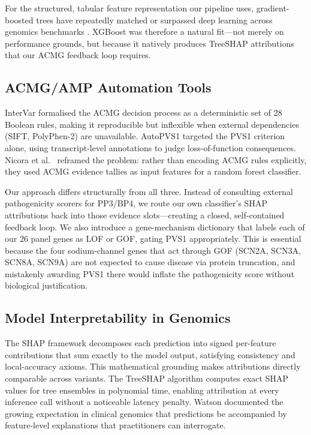 \documentclass[12pt,a4paper]{article}
\begin{document}
For the structured, tabular feature representation our pipeline
uses, gradient-boosted trees have repeatedly matched or surpassed
deep learning across genomics benchmarks \cite{parente2021}.
XGBoost \cite{chen2016xgboost} was therefore a natural fit---not
merely on performance grounds, but because it natively produces
TreeSHAP attributions that our ACMG feedback loop requires.

\subsection{ACMG/AMP Automation Tools}

InterVar \cite{intervar2017} formalised the ACMG decision process
as a deterministic set of 28 Boolean rules, making it reproducible
but inflexible when external dependencies (SIFT, PolyPhen-2) are
unavailable. AutoPVS1 \cite{autopvs1_2020} targeted the PVS1
criterion alone, using transcript-level annotations to judge
loss-of-function consequences. Nicora et al.\ \cite{nicora2022}
reframed the problem: rather than encoding ACMG rules explicitly,
they used ACMG evidence tallies as input features for a random
forest classifier.

Our approach differs structurally from all three. Instead of
consulting external pathogenicity scorers for PP3/BP4, we route
our own classifier's SHAP attributions back into those evidence
slots---creating a closed, self-contained feedback loop. We also
introduce a gene-mechanism dictionary that labels each of our 26
panel genes as LOF or GOF, gating PVS1 appropriately. This is
essential because the four sodium-channel genes that act through
GOF (SCN2A, SCN3A, SCN8A, SCN9A) are not expected to cause disease
via protein truncation, and mistakenly awarding PVS1 there would
inflate the pathogenicity score without biological justification.

\subsection{Model Interpretability in Genomics}

The SHAP framework \cite{lundberg2017shap} decomposes each
prediction into signed per-feature contributions that sum exactly
to the model output, satisfying consistency and local-accuracy
axioms. This mathematical grounding makes attributions directly
comparable across variants. The TreeSHAP algorithm
\cite{lundberg2020trees} computes exact SHAP values for tree
ensembles in polynomial time, enabling attribution at every inference
call without a noticeable latency penalty. Watson \cite{watson2022}
documented the growing expectation in clinical genomics that
predictions be accompanied by feature-level explanations that
practitioners can interrogate.
\end{document}
